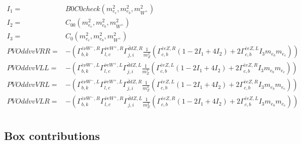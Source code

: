 \documentclass[A4,landscape]{article}
\begin{document}
\begin{align} 
I_1= & B0C0check(m^2_{e_{{c}}}, m^2_{e_{{b}}}, m^2_{W^+}) \\ 
I_2= & C_{00}(m^2_{e_{{c}}}, m^2_{e_{{b}}}, m^2_{W^+}) \\ 
I_3= & C_0(m^2_{e_{{c}}}, m^2_{e_{{b}}}, m^2_{W^+}) \\ 
  PVOddvvVRR= & -( \Gamma^{\bar{e}\nu W^-,R}_{b, k} \Gamma^{\bar{\nu}e W^+ ,R}_{l, c} \Gamma^{\bar{d}d Z ,R}_{j, i} \frac{1}{m^2_{Z}} (\Gamma^{\bar{e}e Z ,R}_{c, b} (1 - 2 I_1 + 4 I_2) + 2 \Gamma^{\bar{e}e Z ,L}_{c, b} I_3 m_{e_{{b}}} m_{e_{{c}}})) \\ 
  PVOddvvVLL= & -( \Gamma^{\bar{e}\nu W^-,L}_{b, k} \Gamma^{\bar{\nu}e W^+ ,L}_{l, c} \Gamma^{\bar{d}d Z ,L}_{j, i} \frac{1}{m^2_{Z}} (\Gamma^{\bar{e}e Z ,L}_{c, b} (1 - 2 I_1 + 4 I_2) + 2 \Gamma^{\bar{e}e Z ,R}_{c, b} I_3 m_{e_{{b}}} m_{e_{{c}}})) \\ 
  PVOddvvVRL= & -( \Gamma^{\bar{e}\nu W^-,L}_{b, k} \Gamma^{\bar{\nu}e W^+ ,L}_{l, c} \Gamma^{\bar{d}d Z ,R}_{j, i} \frac{1}{m^2_{Z}} (\Gamma^{\bar{e}e Z ,L}_{c, b} (1 - 2 I_1 + 4 I_2) + 2 \Gamma^{\bar{e}e Z ,R}_{c, b} I_3 m_{e_{{b}}} m_{e_{{c}}})) \\ 
  PVOddvvVLR= & -( \Gamma^{\bar{e}\nu W^-,R}_{b, k} \Gamma^{\bar{\nu}e W^+ ,R}_{l, c} \Gamma^{\bar{d}d Z ,L}_{j, i} \frac{1}{m^2_{Z}} (\Gamma^{\bar{e}e Z ,R}_{c, b} (1 - 2 I_1 + 4 I_2) + 2 \Gamma^{\bar{e}e Z ,L}_{c, b} I_3 m_{e_{{b}}} m_{e_{{c}}})) \\ 
\end{align} 
\subsection{Box contributions} 
\end{document}
